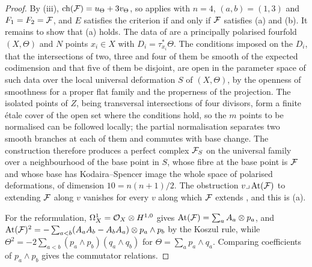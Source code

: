 \begin{proof}
By (iii), $\operatorname{ch}(\mathcal{F})=u_{\Theta}+3v_{\Theta}$, so
 applies with $n=4$, $(a,b)=(1,3)$ and $F_{1}=F_{2}=\mathcal{F}$, and
$E$ satisfies the criterion if and only if $\mathcal{F}$ satisfies (a) and (b). It
remains to show that (a) holds. The data of  are a
principally polarised fourfold $(X,\Theta)$ and $N$ points $x_{i}\in X$ with
$D_{i}=\tau_{x_{i}}^{*}\Theta$. The conditions imposed on the $D_{i}$, that
the intersections of two, three and four of them be smooth of the expected
codimension and that five of them be disjoint, are open in the parameter
space of such data over the local universal deformation $S$ of $(X,\Theta)$,
by the openness of smoothness for a proper flat family and the properness of
the projection. The isolated points of $Z$, being transversal intersections
of four divisors, form a finite \'etale cover of the open set where the
conditions hold, so the $m$ points to be normalised can be followed locally;
the partial normalisation separates two smooth branches at each of them and
commutes with base change. The construction therefore produces a perfect
complex $\mathcal{F}_{S}$ on the universal family over a neighbourhood of the base
point in $S$, whose fibre at the base point is $\mathcal{F}$ and whose base has
Kodaira--Spencer image the whole space of polarised deformations, of
dimension $10=n(n+1)/2$. The obstruction $v\lrcorner\,\mathrm{At}(\mathcal{F})$ to
extending $\mathcal{F}$ along $v$ vanishes for every $v$ along which $\mathcal{F}$ extends
\cite{Tod09}, and this is (a).

For the reformulation, $\Omega^{1}_{X}=\mathcal{O}_{X}\otimes H^{1,0}$ gives
$\mathrm{At}(\mathcal{F})=\sum_{a}A_{a}\otimes p_{a}$, and
$\mathrm{At}(\mathcal{F})^{2}=-\sum_{a<b}(A_{a}A_{b}-A_{b}A_{a})\otimes p_{a}\wedge p_{b}$
by the Koszul rule, while $\Theta^{2}=-2\sum_{a<b}(p_{a}\wedge p_{b})(q_{a}\wedge q_{b})$
for $\Theta=\sum_{a}p_{a}\wedge q_{a}$. Comparing coefficients of
$p_{a}\wedge p_{b}$ gives the commutator relations.
\end{proof}

